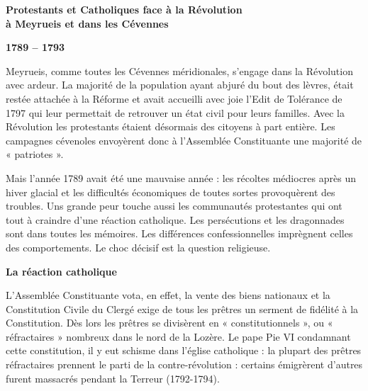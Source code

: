 

{\fontsize{10.15}{11.65}\selectfont


\begin{center}
{\Large\bfseries Protestants et Catholiques face à la Révolution\\
à Meyrueis et dans les Cévennes}

\vspace{1.0em}

{\bfseries 1789 -- 1793}
\end{center}

\vspace{0.55em}

Meyrueis, comme toutes les Cévennes méridionales, s’engage dans la Révolution avec ardeur.
La majorité de la population ayant abjuré du bout des lèvres, était restée attachée à la Réforme et avait accueilli avec joie l’Edit de Tolérance de 1797 qui leur permettait de retrouver un état civil pour leurs familles.
Avec la Révolution les protestants étaient désormais des citoyens à part entière. Les campagnes cévenoles envoyèrent donc à l’Assemblée Constituante une majorité de « patriotes ».

Mais l’année 1789 avait été une mauvaise année : les récoltes médiocres après un hiver glacial et les difficultés économiques de toutes sortes provoquèrent des troubles. Uns grande peur touche aussi les communautés protestantes qui ont tout à craindre d’une réaction catholique.
Les persécutions et les dragonnades sont dans toutes les mémoires.
Les différences confessionnelles imprègnent celles des comportements. Le choc décisif est la question religieuse.

\medskip

\textbf{La réaction catholique}

\vspace{0.45em}

L’Assemblée Constituante vota, en effet, la vente des biens nationaux et la Constitution Civile du Clergé exige de tous les prêtres un serment de fidélité à la Constitution. Dès lors les prêtres se divisèrent en « constitutionnels », ou « réfractaires » nombreux dans le nord de la Lozère.
Le pape Pie VI condamnant cette constitution, il y eut schisme dans l’église catholique : la plupart des prêtres réfractaires prennent le parti de la contre-révolution : certains émigrèrent d’autres furent massacrés pendant la Terreur (1792-1794).

}
